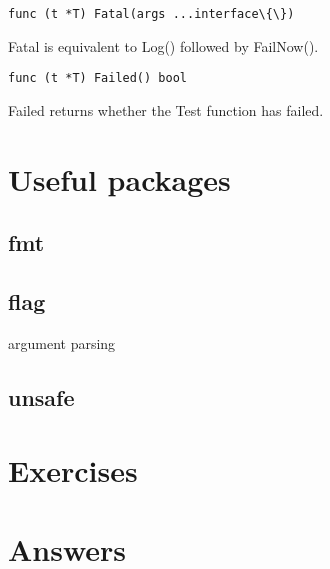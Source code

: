 \begin{lstlisting}
func (t *T) Fatal(args ...interface\{\})
\end{lstlisting}
Fatal is equivalent to Log() followed by FailNow().




\begin{lstlisting}
func (t *T) Failed() bool
\end{lstlisting}
Failed returns whether the Test function has failed.




\section{Useful packages}



\subsection{fmt}

\subsection{flag}
argument parsing

\subsection{unsafe}


\section{Exercises}

\cleardoublepage
\section{Answers}
\shipoutAnswer
